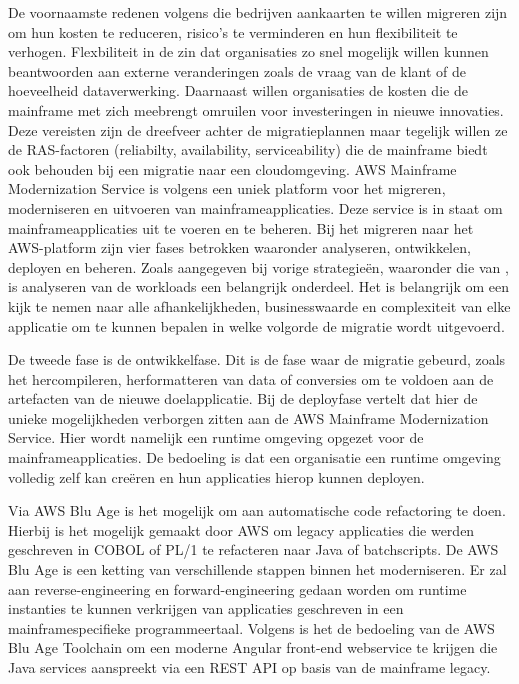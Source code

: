De voornaamste redenen volgens \textcite{Valence2021} die bedrijven aankaarten te willen migreren zijn om hun kosten te reduceren, risico's te verminderen en hun flexibiliteit te verhogen. Flexbiliteit in de zin dat organisaties zo snel mogelijk willen kunnen beantwoorden aan externe veranderingen zoals de vraag van de klant of de hoeveelheid dataverwerking. Daarnaast willen organisaties de kosten die de mainframe met zich meebrengt omruilen voor investeringen in nieuwe innovaties. Deze vereisten zijn de dreefveer achter de migratieplannen maar tegelijk willen ze de RAS-factoren (reliabilty, availability, serviceability) die de mainframe biedt ook behouden bij een migratie naar een cloudomgeving. AWS Mainframe Modernization Service is volgens \textcite{Valence2021} een uniek platform voor het migreren, moderniseren en uitvoeren van mainframeapplicaties. Deze service is in staat om mainframeapplicaties uit te voeren en te beheren. Bij het migreren naar het AWS-platform zijn vier fases betrokken waaronder analyseren, ontwikkelen, deployen en beheren. Zoals aangegeven bij vorige strategieën, waaronder die van \textcite{Marble2017}, is analyseren van de workloads een belangrijk onderdeel. Het is belangrijk om een kijk te nemen naar alle afhankelijkheden, businesswaarde en complexiteit van elke applicatie om te kunnen bepalen in welke volgorde de migratie wordt uitgevoerd. 

De tweede fase is de ontwikkelfase. Dit is de fase waar de migratie gebeurd, zoals het hercompileren, herformatteren van data of conversies om te voldoen aan de artefacten van de nieuwe doelapplicatie. Bij de deployfase vertelt \textcite{Valence2021} dat hier de unieke mogelijkheden verborgen zitten aan de AWS Mainframe Modernization Service. Hier wordt namelijk een runtime omgeving opgezet voor de mainframeapplicaties. De bedoeling is dat een organisatie een runtime omgeving volledig zelf kan creëren en hun applicaties hierop kunnen deployen. 

Via AWS Blu Age is het mogelijk om aan automatische code refactoring te doen. Hierbij is het mogelijk gemaakt door AWS om legacy applicaties die werden geschreven in COBOL of PL/1 te refacteren naar Java of batchscripts. De AWS Blu Age is een ketting van verschillende stappen binnen het moderniseren. Er zal aan reverse-engineering en forward-engineering gedaan worden om runtime instanties te kunnen verkrijgen van applicaties geschreven in een mainframespecifieke programmeertaal. Volgens \textcite{Valence2021} is het de bedoeling van de AWS Blu Age Toolchain om een moderne Angular front-end webservice te krijgen die Java services aanspreekt via een REST API op basis van de mainframe legacy.  

